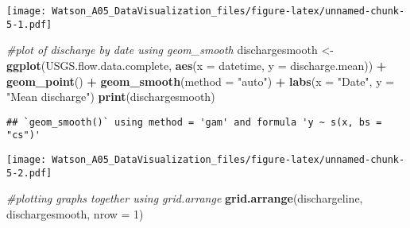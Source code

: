 \documentclass[]{article}
\newenvironment{Shaded}{\begin{snugshade}}{\end{snugshade}}
\newcommand{\KeywordTok}[1]{\textcolor[rgb]{0.13,0.29,0.53}{\textbf{#1}}}
\newcommand{\DataTypeTok}[1]{\textcolor[rgb]{0.13,0.29,0.53}{#1}}
\newcommand{\DecValTok}[1]{\textcolor[rgb]{0.00,0.00,0.81}{#1}}
\newcommand{\StringTok}[1]{\textcolor[rgb]{0.31,0.60,0.02}{#1}}
\newcommand{\CommentTok}[1]{\textcolor[rgb]{0.56,0.35,0.01}{\textit{#1}}}
\newcommand{\OperatorTok}[1]{\textcolor[rgb]{0.81,0.36,0.00}{\textbf{#1}}}
\newcommand{\NormalTok}[1]{#1}
\begin{document}
\begin{Shaded}
\end{Shaded}

\texttt{[image: Watson\_A05\_DataVisualization\_files/figure-latex/unnamed-chunk-5-1.pdf]}

\begin{Shaded}
\begin{Highlighting}[]
\CommentTok{#plot of discharge by date using geom_smooth}
\NormalTok{dischargesmooth <-}\StringTok{ }\KeywordTok{ggplot}\NormalTok{(USGS.flow.data.complete, }\KeywordTok{aes}\NormalTok{(}\DataTypeTok{x =}\NormalTok{ datetime, }\DataTypeTok{y =}\NormalTok{ discharge.mean)) }\OperatorTok{+}
\StringTok{  }\KeywordTok{geom_point}\NormalTok{() }\OperatorTok{+}
\StringTok{  }\KeywordTok{geom_smooth}\NormalTok{(}\DataTypeTok{method =} \StringTok{"auto"}\NormalTok{) }\OperatorTok{+}
\StringTok{  }\KeywordTok{labs}\NormalTok{(}\DataTypeTok{x =} \StringTok{"Date"}\NormalTok{, }\DataTypeTok{y =} \StringTok{"Mean discharge"}\NormalTok{)}
\KeywordTok{print}\NormalTok{(dischargesmooth)}
\end{Highlighting}
\end{Shaded}

\begin{verbatim}
## `geom_smooth()` using method = 'gam' and formula 'y ~ s(x, bs = "cs")'
\end{verbatim}

\texttt{[image: Watson\_A05\_DataVisualization\_files/figure-latex/unnamed-chunk-5-2.pdf]}

\begin{Shaded}
\begin{Highlighting}[]
\CommentTok{#plotting graphs together using grid.arrange}
\KeywordTok{grid.arrange}\NormalTok{(dischargeline, dischargesmooth, }\DataTypeTok{nrow =} \DecValTok{1}\NormalTok{)}
\end{Highlighting}
\end{Shaded}
\end{document}
